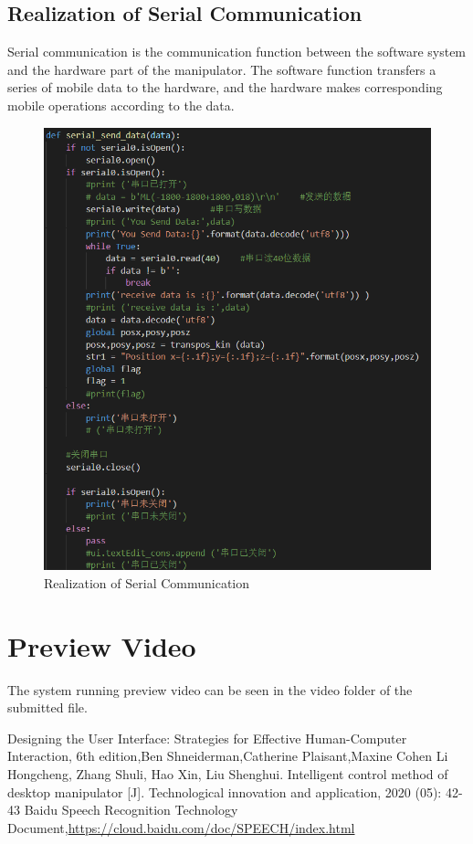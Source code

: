 \documentclass{hci}
\begin{document}
\subsection{Realization of Serial Communication}
Serial communication is the communication function between the software system and the hardware part of the manipulator. The software function transfers a series of mobile data to the hardware, and the hardware makes corresponding mobile operations according to the data.
\begin{figure}[htbp]
	\centering
	\includegraphics[width=0.9\linewidth]{figures/75}
	\caption{Realization of Serial Communication}
	\label{fig:65}
\end{figure}

\section{Preview Video}
The system running preview video can be seen in the video folder of the submitted file.


\begin{thebibliography}{99}
 Designing the User Interface: Strategies for Effective Human-Computer Interaction, 6th edition,Ben Shneiderman,Catherine Plaisant,Maxine Cohen
 Li Hongcheng, Zhang Shuli, Hao Xin, Liu Shenghui. Intelligent control method of desktop manipulator [J]. Technological innovation and application, 2020 (05): 42-43
 Baidu Speech Recognition Technology Document,\url{https://cloud.baidu.com/doc/SPEECH/index.html}
\end{thebibliography}
\end{document}
